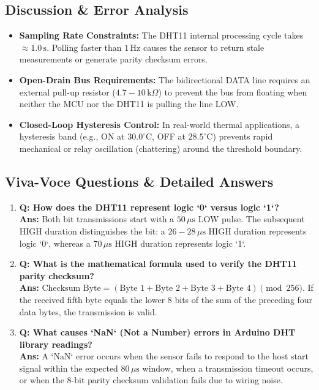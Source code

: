 \documentclass[11pt,a4paper]{article}
\begin{document}
\subsection{Discussion \& Error Analysis}
\begin{itemize}[noitemsep]
    \item \textbf{Sampling Rate Constraints:} The DHT11 internal processing cycle takes $\approx 1.0\,\text{s}$. Polling faster than $1\,\text{Hz}$ causes the sensor to return stale measurements or generate parity checksum errors.
    \item \textbf{Open-Drain Bus Requirements:} The bidirectional DATA line requires an external pull-up resistor ($4.7-10\,\text{k}\Omega$) to prevent the bus from floating when neither the MCU nor the DHT11 is pulling the line LOW.
    \item \textbf{Closed-Loop Hysteresis Control:} In real-world thermal applications, a hysteresis band (e.g., ON at $30.0^\circ\text{C}$, OFF at $28.5^\circ\text{C}$) prevents rapid mechanical or relay oscillation (chattering) around the threshold boundary.
\end{itemize}

\subsection{Viva-Voce Questions \& Detailed Answers}
\begin{enumerate}[leftmargin=*]
    \item \textbf{Q: How does the DHT11 represent logic `0` versus logic `1`?}\\
    \textbf{Ans:} Both bit transmissions start with a $50\,\mu\text{s}$ LOW pulse. The subsequent HIGH duration distinguishes the bit: a $26-28\,\mu\text{s}$ HIGH duration represents logic `0`, whereas a $70\,\mu\text{s}$ HIGH duration represents logic `1`.
    \item \textbf{Q: What is the mathematical formula used to verify the DHT11 parity checksum?}\\
    \textbf{Ans:} $\text{Checksum Byte} = (\text{Byte 1} + \text{Byte 2} + \text{Byte 3} + \text{Byte 4}) \pmod{256}$. If the received fifth byte equals the lower 8 bits of the sum of the preceding four data bytes, the transmission is valid.
    \item \textbf{Q: What causes `NaN` (Not a Number) errors in Arduino DHT library readings?}\\
    \textbf{Ans:} A `NaN` error occurs when the sensor fails to respond to the host start signal within the expected $80\,\mu\text{s}$ window, when a transmission timeout occurs, or when the 8-bit parity checksum validation fails due to wiring noise.
\end{enumerate}
\end{document}
